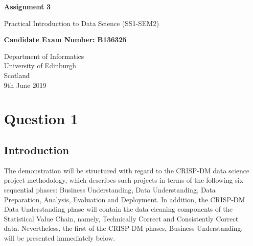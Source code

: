 \documentclass[12pt, oneside, openany]{book}
\begin{document}
    \frontmatter

\begin{titlepage}
   \begin{center}
       \vspace*{1cm}
 
       \textbf{Assignment 3}
 
       \vspace{0.5cm}
        Practical Introduction to Data Science (SS1-SEM2)
 
       \vspace{1.5cm}
 
       \textbf{Candidate Exam Number: B136325}
 
       \vfill
 
       \vspace{0.8cm}
 
       Department of Informatics\\
       University of Edinburgh\\
       Scotland\\
       9th June 2019
 
   \end{center}
\end{titlepage}
    \pagestyle{plain}

    \tableofcontents

    \mainmatter

    \pagestyle{plain}

\setcounter{equation}{0}
\chapter*{Question 1}

\section*{Introduction}
The demonstration will be structured with regard to the CRISP-DM\cite{crispDm1.0} data science project methodology, which describes such projects in terms of the following six sequential phases: Business Understanding, Data Understanding, Data Preparation, Analysis, Evaluation and Deployment. In addition, the CRISP-DM Data Understanding phase will contain the data cleaning components of the Statistical Value Chain, namely, Technically Correct and Consistently Correct data. Nevertheless, the first of the CRISP-DM phases, Business Understanding, will be presented immediately below.
\end{document}
